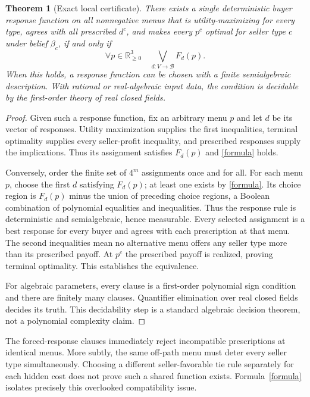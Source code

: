 \documentclass[11pt]{article}
\newtheorem{theorem}{Theorem}
\theoremstyle{remark}
\newcommand{\R}{\mathbb R}
\begin{document}
\begin{theorem}[Exact local certificate]\label{shared}
There exists a single deterministic buyer response function on all nonnegative menus that is utility-maximizing for every type, agrees with all prescribed $d^c$, and makes every $p^c$ optimal for seller type $c$ under belief $\beta_c$, if and only if
\begin{equation}\label{formula}
 \forall p\in\R_{\geq0}^3\quad
 \bigvee_{d:V\to\mathcal B}F_d(p).
\end{equation}
When this holds, a response function can be chosen with a finite semialgebraic description. With rational or real-algebraic input data, the condition is decidable by the first-order theory of real closed fields.
\end{theorem}
\begin{proof}
Given such a response function, fix an arbitrary menu $p$ and let $d$ be its vector of responses. Utility maximization supplies the first inequalities, terminal optimality supplies every seller-profit inequality, and prescribed responses supply the implications. Thus its assignment satisfies $F_d(p)$ and \eqref{formula} holds.

Conversely, order the finite set of $4^m$ assignments once and for all. For each menu $p$, choose the first $d$ satisfying $F_d(p)$; at least one exists by \eqref{formula}. Its choice region is $F_d(p)$ minus the union of preceding choice regions, a Boolean combination of polynomial equalities and inequalities. Thus the response rule is deterministic and semialgebraic, hence measurable. Every selected assignment is a best response for every buyer and agrees with each prescription at that menu. The second inequalities mean no alternative menu offers any seller type more than its prescribed payoff. At $p^c$ the prescribed payoff is realized, proving terminal optimality. This establishes the equivalence.

For algebraic parameters, every clause is a first-order polynomial sign condition and there are finitely many clauses. Quantifier elimination over real closed fields decides its truth. This decidability step is a standard algebraic decision theorem, not a polynomial complexity claim.
\end{proof}

The forced-response clauses immediately reject incompatible prescriptions at identical menus. More subtly, the same off-path menu must deter every seller type simultaneously. Choosing a different seller-favorable tie rule separately for each hidden cost does not prove such a shared function exists. Formula~\eqref{formula} isolates precisely this overlooked compatibility issue.
\end{document}
